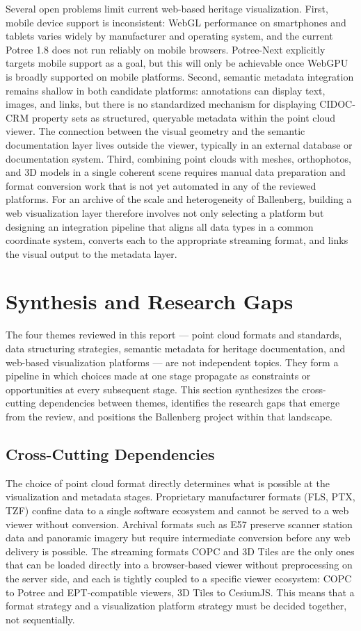\documentclass[]{report}
\begin{document}
Several open problems limit current web-based heritage visualization. First, mobile device
support is inconsistent: WebGL performance on smartphones and tablets varies widely by
manufacturer and operating system, and the current Potree 1.8 does not run reliably on
mobile browsers. Potree-Next explicitly targets mobile support as a goal, but this will
only be achievable once WebGPU is broadly supported on mobile platforms. Second, semantic
metadata integration remains shallow in both candidate platforms: annotations can
display text, images, and links, but there is no standardized mechanism for displaying
CIDOC-CRM property sets as structured, queryable metadata within the point cloud
viewer. The connection between the visual geometry and the semantic documentation layer
lives outside the viewer, typically in an external database or documentation system. Third, combining
point clouds with meshes, orthophotos, and 3D models in a single coherent scene requires
manual data preparation and format conversion work that is not yet automated in any of the
reviewed platforms. For an archive of the scale and heterogeneity of Ballenberg, building
a web visualization layer therefore involves not only selecting a platform but designing
an integration pipeline that aligns all data types in a common coordinate system,
converts each to the appropriate streaming format, and links the visual output to the
metadata layer.
\section{Synthesis and Research Gaps}
\label{sec:synthesis}

The four themes reviewed in this report --- point cloud formats and standards, data structuring
strategies, semantic metadata for heritage documentation, and web-based visualization platforms ---
are not independent topics. They form a pipeline in which choices made at one stage propagate
as constraints or opportunities at every subsequent stage. This section synthesizes the
cross-cutting dependencies between themes, identifies the research gaps that emerge from the
review, and positions the Ballenberg project within that landscape.

\subsection{Cross-Cutting Dependencies}

The choice of point cloud format directly determines what is possible at the visualization and
metadata stages. Proprietary manufacturer formats (FLS, PTX, TZF) confine data to a single
software ecosystem and cannot be served to a web viewer without conversion. Archival formats
such as E57 preserve scanner station data and panoramic imagery but require intermediate
conversion before any web delivery is possible. The streaming formats COPC and 3D Tiles are
the only ones that can be loaded directly into a browser-based viewer without preprocessing
on the server side, and each is tightly coupled to a specific viewer ecosystem: COPC to Potree
and EPT-compatible viewers, 3D Tiles to CesiumJS. This means that a format strategy and a
visualization platform strategy must be decided together, not sequentially.
\end{document}
